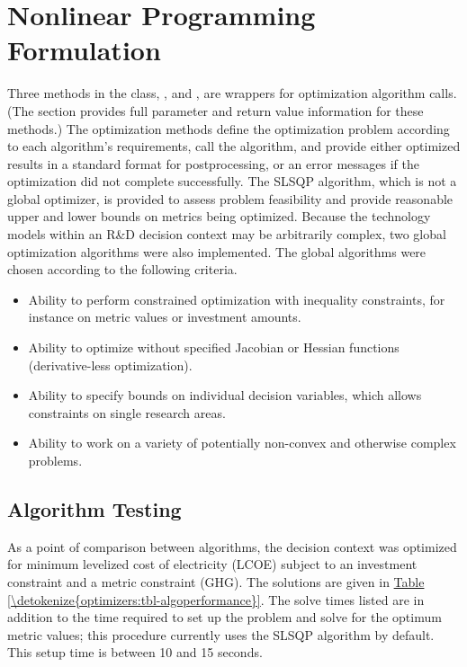 \documentclass[letterpaper,10pt,english]{sphinxmanual}
\begin{document}
\section{Nonlinear Programming Formulation}
\label{\detokenize{optimizers:nonlinear-programming-formulation}}
Three methods in the  class, ,  and , are
wrappers for optimization algorithm calls. (The {\hyperref[\detokenize{tyche:sec-epsconstraint}]{}} section provides full parameter and return value information for these methods.) The optimization methods define the optimization problem according to each algorithm’s requirements, call the algorithm, and provide either optimized results in a standard format for postprocessing, or an error messages if the optimization did not complete successfully. The SLSQP algorithm, which is not a global optimizer, is provided to assess problem feasibility and provide reasonable upper and lower bounds on metrics being optimized. Because the technology models within an R\&D decision context may be arbitrarily complex, two global optimization algorithms were also implemented. The global algorithms were chosen according to the following criteria.
\begin{itemize}
\item {} 
Ability to perform constrained optimization with inequality constraints, for instance on metric values or investment amounts.

\item {} 
Ability to optimize without specified Jacobian or Hessian functions (derivative-less optimization).

\item {} 
Ability to specify bounds on individual decision variables, which allows constraints on single research areas.

\item {} 
Ability to work on a variety of potentially non-convex and otherwise complex problems.

\end{itemize}


\subsection{Algorithm Testing}
\label{\detokenize{optimizers:algorithm-testing}}
As a point of comparison between algorithms, the {\hyperref[\detokenize{technology:sec-simplerespv}]{}} decision context was optimized for minimum levelized cost of electricity (LCOE) subject to an investment constraint and a metric constraint (GHG). The solutions are given in \hyperref[\detokenize{optimizers:tbl-algoperformance}]{Table \ref{\detokenize{optimizers:tbl-algoperformance}}}. The solve times listed are in addition to the time required to set up the problem and solve for the optimum metric values; this procedure currently uses the SLSQP algorithm by default. This setup time is between 10 and 15 seconds.
\end{document}
